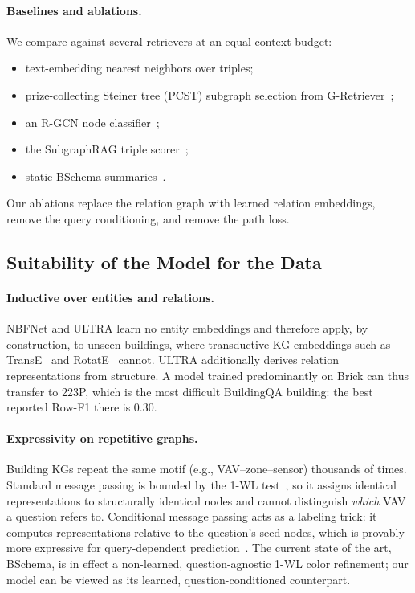 \documentclass[11pt]{article}
\begin{document}
\paragraph{Baselines and ablations.}
We compare against several retrievers at an equal context budget:
\begin{itemize}
  \item text-embedding nearest neighbors over triples;
  \item prize-collecting Steiner tree (PCST) subgraph selection from G-Retriever~\cite{he2024gretriever};
  \item an R-GCN node classifier~\cite{schlichtkrull2018rgcn};
  \item the SubgraphRAG triple scorer~\cite{li2025subgraphrag};
  \item static BSchema summaries~\cite{bschema2026}.
\end{itemize}
Our ablations replace the relation graph with learned relation embeddings, remove the query conditioning, and remove the path loss.

\subsection{Suitability of the Model for the Data}

\paragraph{Inductive over entities and relations.}
NBFNet and ULTRA learn no entity embeddings and therefore apply, by construction, to unseen buildings, where transductive KG embeddings such as TransE~\cite{bordes2013transe} and RotatE~\cite{sun2019rotate} cannot. ULTRA additionally derives relation representations from structure. A model trained predominantly on Brick can thus transfer to 223P, which is the most difficult BuildingQA building: the best reported Row-F1 there is $0.30$.

\paragraph{Expressivity on repetitive graphs.}
Building KGs repeat the same motif (e.g., VAV--zone--sensor) thousands of times. Standard message passing is bounded by the 1-WL test~\cite{xu2019gin}, so it assigns identical representations to structurally identical nodes and cannot distinguish \emph{which} VAV a question refers to. Conditional message passing acts as a labeling trick: it computes representations relative to the question's seed nodes, which is provably more expressive for query-dependent prediction~\cite{huang2023relationalwl}. The current state of the art, BSchema, is in effect a non-learned, question-agnostic 1-WL color refinement; our model can be viewed as its learned, question-conditioned counterpart.
\end{document}
